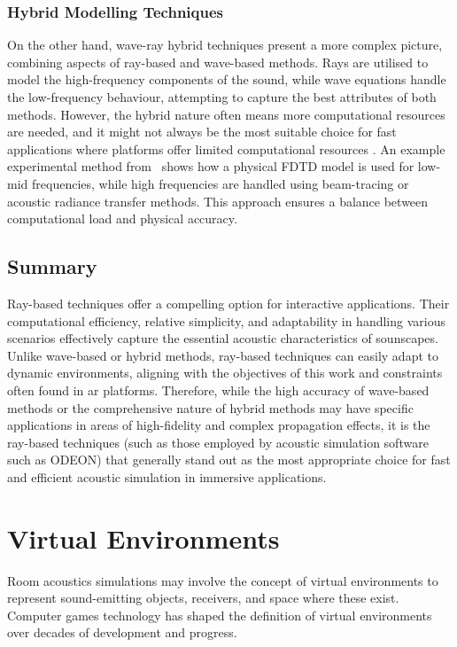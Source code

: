 \subsubsection{Hybrid Modelling Techniques}
On the other hand, wave-ray hybrid techniques present a more complex picture, combining aspects of ray-based and wave-based methods. Rays are utilised to model the high-frequency components of the sound, while wave equations handle the low-frequency behaviour, attempting to capture the best attributes of both methods. However, the hybrid nature often means more computational resources are needed, and it might not always be the most suitable choice for fast applications where platforms offer limited computational resources \citep{hulusic2012acoustic}.
An example experimental method from~\cite{southern2013room} shows how a physical FDTD model is used for low-mid frequencies, while high frequencies are handled using beam-tracing or acoustic radiance transfer methods. This approach ensures a balance between computational load and physical accuracy.


\subsection{Summary}
Ray-based techniques offer a compelling option for interactive applications. Their computational efficiency, relative simplicity, and adaptability in handling various scenarios effectively capture the essential acoustic characteristics of sounscapes. Unlike wave-based or hybrid methods, ray-based techniques can easily adapt to dynamic environments, aligning with the objectives of this work and constraints often found in \acrshort{ar} platforms. Therefore, while the high accuracy of wave-based methods or the comprehensive nature of hybrid methods may have specific applications in areas of high-fidelity and complex propagation effects, it is the ray-based techniques (such as those employed by acoustic simulation software such as ODEON) that generally stand out as the most appropriate choice for fast and efficient acoustic simulation in immersive applications.

\section{Virtual Environments}
Room acoustics simulations may involve the concept of virtual environments to represent sound-emitting objects, receivers, and space where these exist. Computer games technology has shaped the definition of virtual environments over decades of development and progress.


